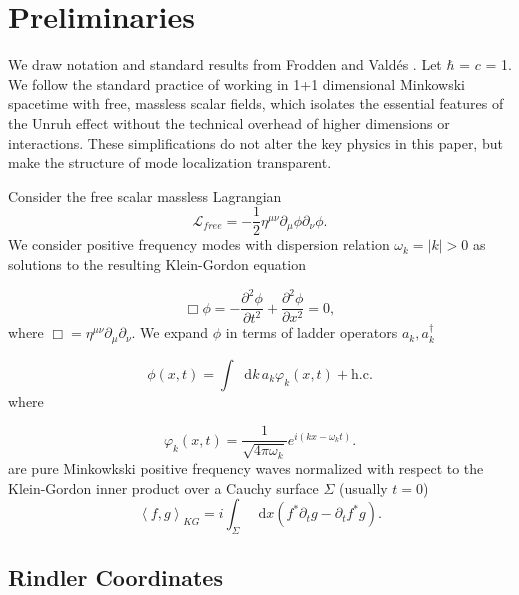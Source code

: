 \documentclass[12pt,a4paper]{article}
\newcommand*\diff{\mathop{}\!\mathrm{d}}
\begin{document}
\section{Preliminaries} \label{sec:prelim}

We draw notation and standard results from Frodden and Vald{\'{e}}s \cite{frodden2018unruh}. Let $\hbar$ = $c$ = 1. We follow the standard practice of working in 1+1 dimensional Minkowski spacetime with free, massless scalar fields, which isolates the essential features of the Unruh effect without the technical overhead of higher dimensions or interactions. These simplifications do not alter the key physics in this paper, but make the structure of mode localization transparent.

Consider the free scalar massless Lagrangian
\begin{equation}
\mathscr{L}_{free} = -\frac{1}{2} \eta^{\mu\nu}\partial_\mu \phi \partial_\nu \phi.
\end{equation}
We consider positive frequency modes with dispersion relation $\omega_k = |k| > 0$ as solutions to the resulting Klein-Gordon equation 

\begin{equation}
  \Box \phi = -\frac{\partial^2 \phi}{\partial t^2} + \frac{\partial^2 \phi}{\partial x^2} = 0,
 \label{massless-wave-eq}
\end{equation}
where $\Box = \eta^{\mu\nu} \partial_\mu \partial_\nu$. We expand $\phi$ in terms of ladder operators $a_k, a_k^\dagger$

\begin{equation}
  \phi(x,t) = \int \diff k \, a_k \varphi_k(x,t) + \text{h.c.}
\end{equation}
where

\begin{equation}
  \varphi_k(x,t) = \frac{1}{\sqrt{4\pi\omega_k}} e^{i(kx - \omega_k t)}.
\label{amode}
\end{equation}
are pure Minkowkski positive frequency waves normalized with respect to the Klein-Gordon inner product over a Cauchy surface $\Sigma$ (usually $t = 0$)
\begin{equation}
  \left<f, g\right>_{KG} = i \int_\Sigma \diff x (f^* \partial_t g - \partial_t f^* g).
\end{equation}

\subsection{Rindler Coordinates} 
\end{document}
